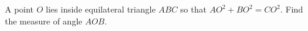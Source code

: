 A point $O$ lies inside equilateral triangle $ABC$ so that $AO^2+BO^2=CO^2$. Find the measure of angle $AOB$.
